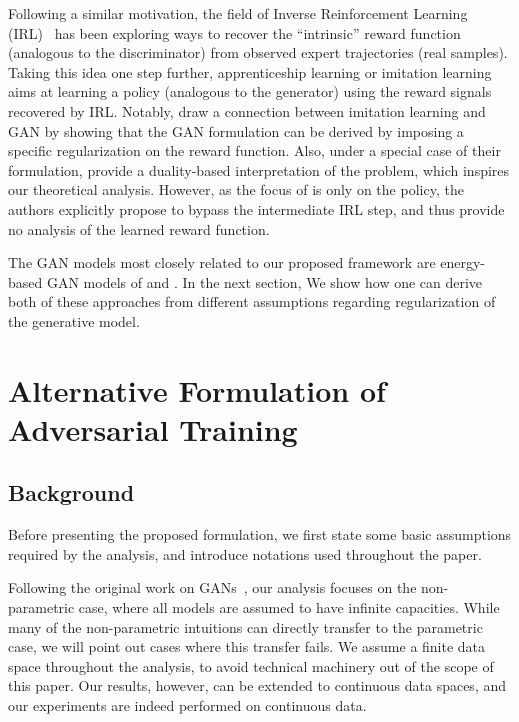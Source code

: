\documentclass[a4paper]{article}
\begin{document}
Following a similar motivation, the field of Inverse Reinforcement Learning (IRL)~\citep{ng2000algorithms} has been exploring ways to recover the ``intrinsic'' reward function (analogous to the discriminator) from observed expert trajectories (real samples).
Taking this idea one step further, apprenticeship learning or imitation learning~\citep{abbeel2004apprenticeship,ziebart2008maximum} aims at learning a policy (analogous to the generator) using the reward signals recovered by IRL.
Notably, \citeauthor{ho2016generative} draw a connection between imitation learning and GAN by showing that the GAN formulation can be derived by imposing a specific regularization on the reward function.
Also, under a special case of their formulation, \citeauthor{ho2016generative} provide a duality-based interpretation of the problem, which inspires our theoretical analysis.
However, as the focus of \citep{ho2016generative} is only on the policy, the authors explicitly propose to bypass the intermediate IRL step, and thus provide no analysis of the learned reward function.


The GAN models most closely related to our proposed framework are energy-based GAN models of \citet{zhao2016energy} and \citet{kim2016deep}. In the next section, We show how one can derive both of these approaches from different assumptions regarding regularization of the generative model. 


 \section{Alternative Formulation of Adversarial Training}
\label{sec:formulation}

\subsection{Background}
Before presenting the proposed formulation, we first state some basic assumptions required by the analysis, and introduce notations used throughout the paper.

Following the original work on GANs~\citep{goodfellow2014generative}, our analysis focuses on the non-parametric case, where all models are assumed to have infinite capacities.
While many of the non-parametric intuitions can directly transfer to the parametric case, we will point out cases where this transfer fails.
We assume a finite data space throughout the analysis, to avoid technical machinery out of the scope of this paper.
Our results, however, can be extended to continuous data spaces, and our experiments are indeed performed on continuous data.
\end{document}
